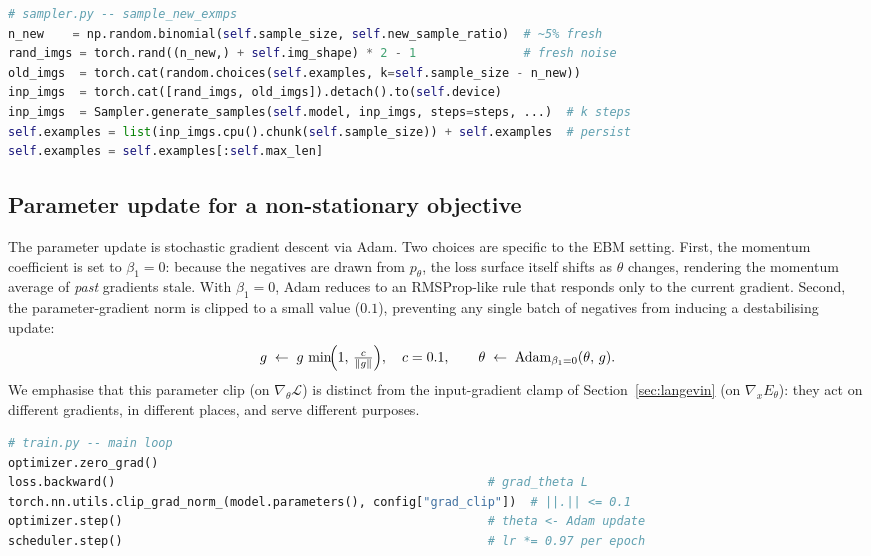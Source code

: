 \begin{lstlisting}[language=Python]
# sampler.py -- sample_new_exmps
n_new    = np.random.binomial(self.sample_size, self.new_sample_ratio)  # ~5% fresh
rand_imgs = torch.rand((n_new,) + self.img_shape) * 2 - 1               # fresh noise
old_imgs  = torch.cat(random.choices(self.examples, k=self.sample_size - n_new))
inp_imgs  = torch.cat([rand_imgs, old_imgs]).detach().to(self.device)
inp_imgs  = Sampler.generate_samples(self.model, inp_imgs, steps=steps, ...)  # k steps
self.examples = list(inp_imgs.cpu().chunk(self.sample_size)) + self.examples  # persist
self.examples = self.examples[:self.max_len]
\end{lstlisting}

\subsection{Parameter update for a non-stationary objective}

The parameter update is stochastic gradient descent via Adam. Two choices are specific to
the EBM setting. First, the momentum coefficient is set to $\beta_1 = 0$: because the
negatives are drawn from $p_\theta$, the loss surface itself shifts as $\theta$ changes,
rendering the momentum average of \emph{past} gradients stale. With $\beta_1 = 0$, Adam
reduces to an RMSProp-like rule that responds only to the current gradient. Second, the
parameter-gradient norm is clipped to a small value ($0.1$), preventing any single batch
of negatives from inducing a destabilising update:
\begin{equation}
  g \;\leftarrow\; g\,\min\!\Bigl(1,\, \tfrac{c}{\|g\|}\Bigr),\quad c = 0.1,
  \qquad
  \theta \;\leftarrow\; \mathrm{Adam}_{\beta_1=0}(\theta,\, g).
  \label{eq:update}
\end{equation}
We emphasise that this parameter clip (on $\nabla_\theta \mathcal{L}$) is distinct from the
input-gradient clamp of Section~\ref{sec:langevin} (on $\nabla_x E_\theta$): they act on
different gradients, in different places, and serve different purposes.

\begin{lstlisting}[language=Python]
# train.py -- main loop
optimizer.zero_grad()
loss.backward()                                                    # grad_theta L
torch.nn.utils.clip_grad_norm_(model.parameters(), config["grad_clip"])  # ||.|| <= 0.1
optimizer.step()                                                   # theta <- Adam update
scheduler.step()                                                   # lr *= 0.97 per epoch
\end{lstlisting}

